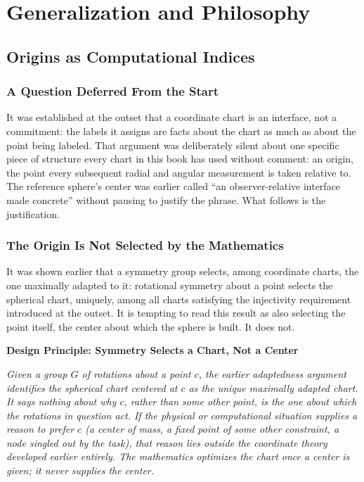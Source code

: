 \documentclass[11pt,fleqn]{book}
\numberwithin{equation}{chapter}
\newenvironment{principle}[1]
  {\begin{principleEnv}
   \noindent\textbf{Design Principle: #1}\par\smallskip\itshape}
  {\end{principleEnv}}
\theoremstyle{plain}
\theoremstyle{definition}
\theoremstyle{remark}
\providecommand{\enquote}[1]{``#1''}
\begin{document}
\part{Generalization and Philosophy}


\chapter{Origins as Computational Indices}

\section{A Question Deferred From the Start}

It was established at the outset that a coordinate chart is an interface, not a commitment: the labels it assigns are facts about the chart as much as about the point being labeled. That argument was deliberately silent about one specific piece of structure every chart in this book has used without comment: an origin, the point every subsequent radial and angular measurement is taken relative to. The reference sphere's center was earlier called \enquote{an observer-relative interface made concrete} without pausing to justify the phrase. What follows is the justification.

\section{The Origin Is Not Selected by the Mathematics}

It was shown earlier that a symmetry group selects, among coordinate charts, the one maximally adapted to it: rotational symmetry about a point selects the spherical chart, uniquely, among all charts satisfying the injectivity requirement introduced at the outset. It is tempting to read this result as also selecting the point itself, the center about which the sphere is built. It does not.

\begin{principle}{Symmetry Selects a Chart, Not a Center}
Given a group \(G\) of rotations about a point \(c\), the earlier adaptedness argument identifies the spherical chart centered at \(c\) as the unique maximally adapted chart. It says nothing about why \(c\), rather than some other point, is the one about which the rotations in question act. If the physical or computational situation supplies a reason to prefer \(c\) (a center of mass, a fixed point of some other constraint, a node singled out by the task), that reason lies outside the coordinate theory developed earlier entirely. The mathematics optimizes the chart once a center is given; it never supplies the center.
\end{principle}
\end{document}
